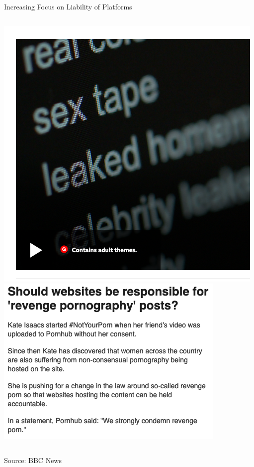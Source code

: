 \documentclass[nobackground,dvipsnames,table,aspectratio=169]{beamer}
\begin{document}
\begin{frame}{Increasing Focus on Liability of Platforms}
    \begin{columns}
            \includegraphics[width=\textwidth]{bbc-liability-video}
            \includegraphics[width=\textwidth]{bbc-liability-article}
    \end{columns}
    Source: BBC News
\end{frame}
\end{document}
